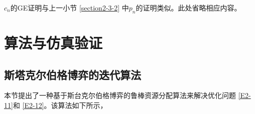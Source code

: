 $c_n$的GE证明与上一小节 \ref{section2-3-2} 中$p_n$的证明类似。此处省略相应内容。

\section{算法与仿真验证}\label{section2-4}
\subsection{斯塔克尔伯格博弈的迭代算法}\label{section2-4-1}
本节提出了一种基于斯台克尔伯格博弈的鲁棒资源分配算法来解决优化问题 \eqref{E2-11}和 \eqref{E2-12}。该算法如下所示，

